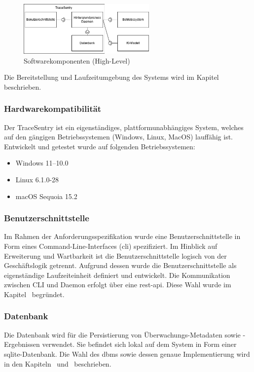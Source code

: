\documentclass[a4paper,12pt]{report}
\begin{document}
    \begin{figure}[h]
        \centering
        \includegraphics[width=0.6\textwidth]{assets/komponenten-grob}
        \caption{Softwarekomponenten (High-Level)}
        \label{fig:komponenten-grob}
    \end{figure}
    Die Bereitstellung und Laufzeitumgebung des Systems wird im Kapitel~ beschrieben.

    \subsubsection{Hardwarekompatibilität}
    Der TraceSentry ist ein eigenständiges, plattformunabhängiges System, welches auf den gängigen Betriebssystemen (Windows, Linux, MacOS) lauffähig ist.
    Entwickelt und getestet wurde auf folgenden Betriebssystemen:
    \begin{itemize}
        \item Windows 11--10.0
        \item Linux 6.1.0-28
        \item macOS Sequoia 15.2
    \end{itemize}

    \subsubsection{Benutzerschnittstelle}
    Im Rahmen der Anforderungsspezifikation wurde eine Benutzerschnittstelle in Form eines Command-Line-Interfaces (\gls{cli}) spezifiziert.
    Im Hinblick auf Erweiterung und Wartbarkeit ist die Benutzerschnittstelle logisch von der Geschäftslogik getrennt.
    Aufgrund dessen wurde die Benutzerschnittstelle als eigenständige Laufzeiteinheit definiert und entwickelt.
    Die Kommunikation zwischen CLI und Daemon erfolgt über eine \gls{rest}-\gls{api}\@.
    Diese Wahl wurde im Kapitel~ begründet.

    \subsubsection{Datenbank}\label{subsubsec:spezifikation-datenbank}
    Die Datenbank wird für die Persistierung von Überwachungs-Metadaten sowie -Ergebnissen verwendet.
    Sie befindet sich lokal auf dem System in Form einer \gls{sqlite}-Datenbank.
    Die Wahl des \gls{dbms} sowie dessen genaue Implementierung wird in den Kapiteln~ und~ beschrieben.
\end{document}
